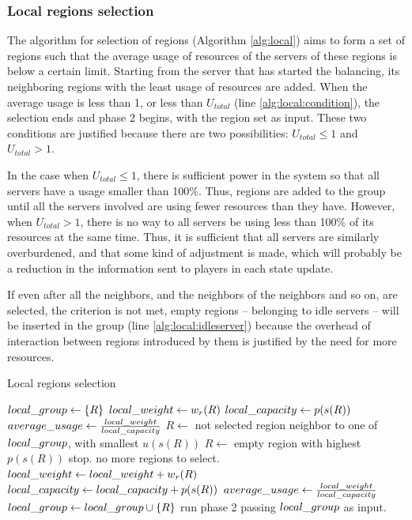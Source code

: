 \subsubsection{Local regions selection}
\label{sec:alg:localselect}

The algorithm for selection of regions (Algorithm \ref{alg:local}) aims to form a set of regions such that the average usage of resources of the servers of these regions is below a certain limit. Starting from the server that has started the balancing, its neighboring regions with the least usage of resources are added. When the average usage is less than 1, or less than $ U_{total}$ (line \ref{alg:local:condition}), the selection ends and phase 2 begins, with the region set as input. These two conditions are justified because there are two possibilities: $U_{total} \leq 1$ and $U_{total} > 1$.
	
In the case when $U_{total} \leq 1$, there is sufficient power in the system so that all servers have a usage smaller than 100\%. Thus, regions are added to the group until all the servers involved are using fewer resources than they have. However, when $U_{total} > 1$, there is no way to all servers be using less than 100\% of its resources at the same time. Thus, it is sufficient that all servers are similarly overburdened, and that some kind of adjustment is made, which will probably be a reduction in the information sent to players in each state update.

If even after all the neighbors, and the neighbors of the neighbors and so on, are selected, the criterion is not met, empty regions -- belonging to idle servers -- will be inserted in the group (line \ref{alg:local:idleserver}) because the overhead of interaction between regions introduced by them is justified by the need for more resources.

\begin{algorithm}
\caption{Local regions selection}
\label{alg:local}
\begin{algorithmic}[1]
	 \STATE $local\_group \leftarrow \{R\}$
	 \STATE $local\_weight \leftarrow w_r(R)$
	 \STATE $local\_capacity \leftarrow p(s(R))$
	 \STATE $average\_usage \leftarrow \frac{local\_weight}{local\_capacity}$
	  \label{alg:local:condition}
	 			 \STATE $R \leftarrow$ not selected region neighbor to one of $local\_group$, with smallest $u(s(R))$
	 		 \label{alg:local:idleserver}
	 			 \STATE $R \leftarrow$ empty region with highest $p(s(R))$
	 		\ELSE
	 			 \STATE stop. no more regions to select.
	 		\ENDIF
	 		\STATE $local\_weight \leftarrow local\_weight + w_r(R)$
	 		\STATE $local\_capacity \leftarrow local\_capacity + p(s(R))$
	 		\STATE $average\_usage \leftarrow \frac{local\_weight}{local\_capacity}$
	 		\STATE $local\_group \leftarrow local\_group \cup \{R\}$
	 \ENDWHILE
	 \STATE run phase 2 passing $local\_group$ as input.
\end{algorithmic}
\end{algorithm}

